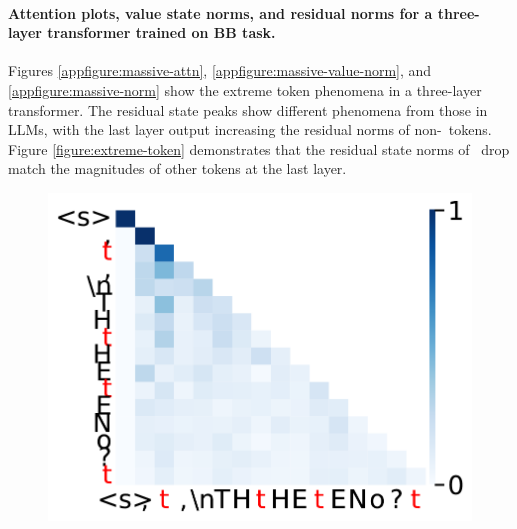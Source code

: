 \paragraph{Attention plots, value state norms, and residual norms for a three-layer transformer trained on BB task.} Figures \ref{appfigure:massive-attn}, \ref{appfigure:massive-value-norm}, and \ref{appfigure:massive-norm} show the extreme token phenomena in a three-layer transformer. The residual state peaks show different phenomena from those in LLMs, with the last layer output increasing the residual norms of non-\bos~tokens. Figure \ref{figure:extreme-token}
 demonstrates that the residual state norms of \bos~drop match the magnitudes of other tokens at the last layer. 
\begin{figure}[t]
  \centering
  \begin{minipage}{0.3\textwidth}
      \centering
      \vspace{-.2em}
      \includegraphics[width=\linewidth]{Figures/BBM_appendix/massive_attn_fig0.pdf}
  \end{minipage}
  \begin{minipage}{0.3\textwidth}
      \centering
      \vspace{-.2em}

\end{minipage}
\end{figure}
